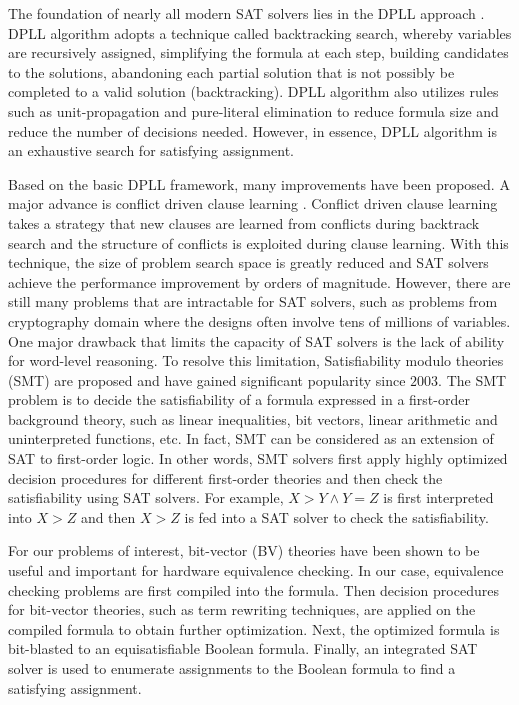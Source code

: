 The foundation of nearly all modern SAT solvers lies in the DPLL approach \cite{dll}.
DPLL algorithm adopts a technique called backtracking search, whereby variables are recursively
assigned, simplifying the formula at each step, building candidates to the solutions,
abandoning each partial solution that is not possibly be completed to a valid solution (backtracking).
DPLL algorithm also utilizes rules such as unit-propagation and pure-literal elimination to 
reduce formula size and reduce the number of decisions needed. However, in essence,
DPLL algorithm is an exhaustive search for satisfying assignment.

Based on the basic DPLL framework, many improvements have been proposed. 
A major advance is conflict driven clause learning \cite{grasp:96}. 
Conflict driven clause learning takes a strategy that new clauses are learned from conflicts during backtrack search
and the structure of conflicts is exploited during clause learning. 
With this technique, the size of problem search space is greatly reduced and SAT solvers
achieve the performance improvement by orders of magnitude.
However, there are still many problems that are intractable for SAT solvers, 
such as problems from cryptography domain where the designs often involve tens of millions of variables.
One major drawback that limits the capacity of SAT solvers is the lack of ability for word-level reasoning.
To resolve this limitation, Satisfiability modulo theories (SMT) are proposed and have gained significant popularity since $2003$.
The SMT problem is to decide the satisfiability of a formula expressed in a first-order background theory, 
such as linear inequalities, bit vectors, linear arithmetic and uninterpreted functions, etc.  
In fact, SMT can be considered as an extension of SAT to first-order logic. In other words, 
SMT solvers first apply highly optimized decision procedures for different first-order theories
and then check the satisfiability using SAT solvers. 
For example, $X>Y \wedge Y=Z$ is first interpreted into $X>Z$ and then $X>Z$ is fed into a SAT solver to check the satisfiability.

For our problems of interest, bit-vector (BV) theories have been shown to be useful and important for hardware equivalence checking.
In our case, equivalence checking problems are first compiled into the formula. Then decision procedures 
for bit-vector theories, such as term rewriting techniques,
are applied on the compiled formula to obtain further optimization. Next, the optimized formula is bit-blasted to 
an equisatisfiable Boolean formula. Finally, an integrated SAT solver is used to enumerate assignments to the Boolean formula
to find a satisfying assignment.


